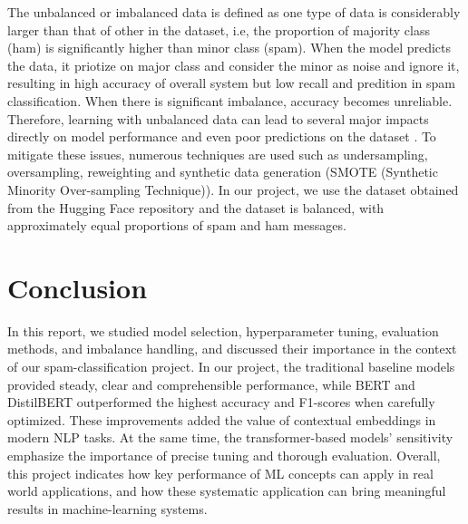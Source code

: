\documentclass[11pt]{article}
\begin{document}
The unbalanced or imbalanced data is defined as one type of data is considerably larger than that of other in the dataset, i.e, the proportion of majority class (ham) is significantly higher than minor class (spam). When the model predicts the data, it priotize on major class and consider the minor as noise and ignore it, resulting in high accuracy of overall system but low recall and predition in spam classification. When there is significant imbalance, accuracy becomes unreliable. Therefore, learning with unbalanced data can lead to several major impacts directly on model performance and even poor predictions on the dataset \cite{werner2023imbalanced}. To mitigate these issues, numerous techniques are used such as undersampling, oversampling, reweighting and synthetic data generation (SMOTE (Synthetic Minority Over-sampling Technique)). In our project, we use the dataset obtained from the Hugging Face repository and the dataset is balanced, with approximately equal proportions of spam and ham messages. 

\section{Conclusion}
In this report, we studied model selection, hyperparameter tuning, evaluation methods, and imbalance handling, and discussed their importance in the context of our spam-classification project. In our project, the traditional baseline models provided steady, clear and comprehensible performance, while BERT and DistilBERT outperformed the highest accuracy and F1-scores when carefully optimized. These improvements added the value of contextual embeddings in modern NLP tasks. At the same time, the transformer-based models' sensitivity emphasize the importance of precise tuning and thorough evaluation. Overall, this project indicates how key performance of ML concepts can apply in real world applications, and how these systematic application can bring meaningful results in machine-learning systems.


 
\newpage

\end{document}
